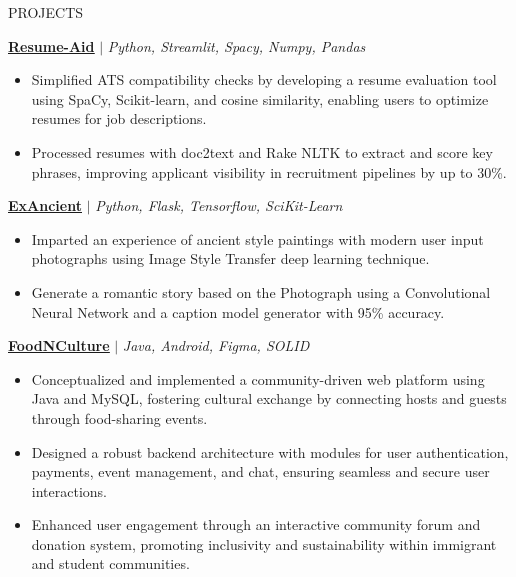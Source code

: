 \documentclass{resume} %
\begin{document}

\begin{rSection}{PROJECTS}
\vspace{0.05em}

\href{https://github.com/RutvikJ77/Resume-aid}{\textbf{\underline{Resume-Aid}}} $|$\textit{ Python, Streamlit, Spacy, Numpy, Pandas}
\begin{itemize}
    \item Simplified ATS compatibility checks by developing a resume evaluation tool using SpaCy, Scikit-learn, and cosine similarity, enabling users to optimize resumes for job descriptions.
    \item Processed resumes with doc2text and Rake NLTK to extract and score key phrases, improving applicant visibility in recruitment pipelines by up to 30\%.
\end{itemize}

\href{https://github.com/RutvikJ77/ExAncient}{\textbf{\underline{ExAncient}}} $|$\textit{ Python, Flask, Tensorflow, SciKit-Learn}
\begin{itemize}
    \item {Imparted an experience of ancient style paintings with modern user input photographs using Image Style Transfer deep learning technique.}
    \item {Generate a romantic story based on the Photograph using a Convolutional Neural Network and a caption model generator with 95\% accuracy.}
\end{itemize}

\href{https://github.com/RutvikJ77/FoodNCulture}{\textbf{\underline{FoodNCulture}}} $|$\textit{ Java, Android, Figma, SOLID}
\begin{itemize}
  \item Conceptualized and implemented a community-driven web platform using Java and MySQL, fostering cultural exchange by connecting hosts and guests through food-sharing events.
  \item Designed a robust backend architecture with modules for user authentication, payments, event management, and chat, ensuring seamless and secure user interactions.
  \item Enhanced user engagement through an interactive community forum and donation system, promoting inclusivity and sustainability within immigrant and student communities.
\end{itemize}


\end{rSection}
\end{document}
